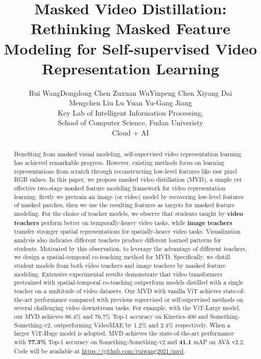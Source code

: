 \documentclass[10pt,twocolumn,letterpaper]{article}
\begin{document}
\title{Masked Video Distillation: Rethinking Masked Feature Modeling for Self-supervised Video Representation Learning}

\author{Rui Wang\footnotemark[1] \quad Dongdong Chen \quad Zuxuan Wu\footnotemark[2] \quad Yinpeng Chen \quad Xiyang Dai\\ \quad Mengchen Liu \quad Lu Yuan \quad Yu-Gang Jiang\footnotemark[2] \\
\normalsizeShanghai Key Lab of Intelligent Information Processing, \\ \normalsize School of Computer Science, Fudan Univeristy\\
\normalsizeMicrosoft Cloud + AI
}
\maketitle

\renewcommand{\thefootnote}{\fnsymbol{footnote}}
 

\begin{abstract}
Benefiting from masked visual modeling, self-supervised video representation learning has achieved remarkable progress. However, existing methods focus on learning representations from scratch through reconstructing low-level features like raw pixel RGB values. In this paper, we propose masked video distillation (MVD), a simple yet effective two-stage masked feature modeling framework for video representation learning: firstly we pretrain an image (or video) model by recovering low-level features of masked patches, then we use the resulting features as targets for masked feature modeling. For the choice of teacher models, we observe that students taught by \textbf{video teachers} perform better on temporally-heavy video tasks, while \textbf{image teachers} transfer stronger spatial representations for spatially-heavy video tasks. Visualization analysis also indicates different teachers produce different learned patterns for students.
Motivated by this observation, to leverage the advantage of different teachers, we design a spatial-temporal co-teaching method for MVD. Specifically, we distill student models from both video teachers and image teachers by masked feature modeling. Extensive experimental results demonstrate that video transformers pretrained with spatial-temporal co-teaching outperform models distilled with a single teacher on a multitude of video datasets. Our MVD with vanilla ViT achieves state-of-the-art performance compared with previous supervised or self-supervised methods on several challenging video downstream tasks. For example, with the ViT-Large model, our MVD achieves 86.4\%  and 76.7\% Top-1 accuracy on Kinetics-400 and Something-Something-v2, outperforming VideoMAE by 1.2\% and 2.4\% respectively. When a larger ViT-Huge model is adopted, MVD achieves the state-of-the-art performance with \textbf{77.3\%} Top-1 accuracy on Something-Something-v2 and \textbf{41.1} mAP on AVA v2.2. Code will be available at \url{https://github.com/ruiwang2021/mvd}.

\end{abstract}
\end{document}
